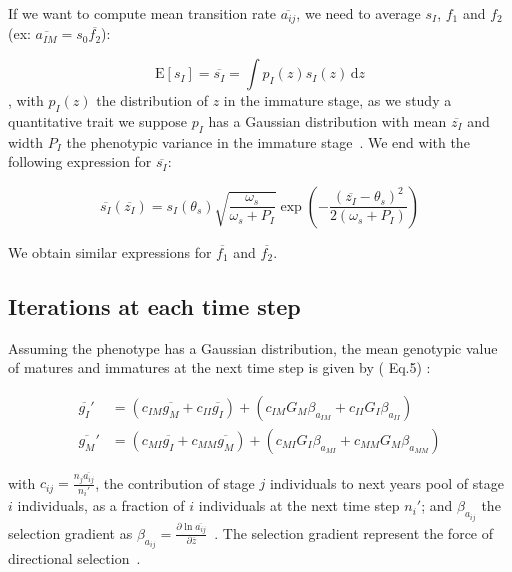 If we want to compute mean transition rate $\overline{a_{ij}}$, we need to average $s_I$, $f_1$ and $f_2$ (ex: $\overline{a_{IM}} = s_0 \overline{f_2}$):

\begin{equation}
	\mathrm{E}[s_I] = \overline{s_I} = \int p_I(z)s_I(z)\,\text{d}z
\end{equation}
, with $p_I(z)$ the distribution of $z$ in the immature stage, as we study a quantitative trait we suppose $p_I$ has a Gaussian distribution with mean $\overline{z_I}$ and width $P_I$ the phenotypic variance in the immature stage~\citep{lande_quantitative_1982}. We end with the following expression for $\overline{s_I}$:

\begin{equation}
	\label{eq:poplht}
	\overline{s_{I}}(\overline{z_{I}}) = s_{I}(\theta_{s}) \sqrt{\frac{\omega_{s}}{\omega_{s}+P_{I}}}	\exp\left(-\frac{(\overline{z_{I}} - \theta_{s})^2}{2(\omega_{s}+P_{I})}\right)
\end{equation}

We obtain similar expressions for $\overline{f_1}$ and $\overline{f_2}$.	

\subsection*{Iterations at each time step}

Assuming the phenotype has a Gaussian distribution,  the mean genotypic value of matures and immatures at the next time step is given by (\citealt{barfield_evolution_2011} Eq.5) :

\begin{subequations}
	\begin{align}
		\label{eq:genotypic}
		\overline{g_{I}}' &= (c_{I M} \overline{g_{M}} + c_{I I} \overline{g_{I}}) + 
			(c_{I M} G_M \beta_{a_{IM}} + c_{I I} G_I \beta_{a_{II}}) \\
		\overline{g_{M}}' &=	 (c_{M I} \overline{g_{I}} + c_{M M} \overline{g_{M}})  +
				(c_{M I} G_I \beta_{a_{MI}} + c_{M M} G_M \beta_{a_{MM}})
	\end{align}
\end{subequations}

with $c_{ij} = \frac{n_j \overline{a_{ij}}}{n_i'}$, the contribution of stage $j$ individuals to next years pool of stage $i$ individuals, as a fraction of $i$ individuals at the next time step $n_i'$; and $\beta_{a_{ij}}$ the selection gradient as $\beta_{a_{ij}} = \frac{\partial \ln \overline{a_{ij}}}{\partial \overline{z}}$~\citep{barfield_evolution_2011}. The selection gradient represent the force of directional selection~\citep{lande_quantitative_1982}.

